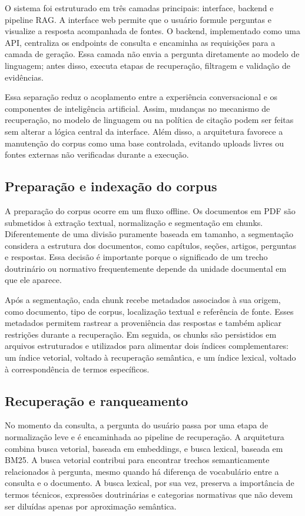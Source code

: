 O sistema foi estruturado em três camadas principais: interface, backend e pipeline RAG. A interface web permite que o usuário formule perguntas e visualize a resposta acompanhada de fontes. O backend, implementado como uma API, centraliza os endpoints de consulta e encaminha as requisições para a camada de geração. Essa camada não envia a pergunta diretamente ao modelo de linguagem; antes disso, executa etapas de recuperação, filtragem e validação de evidências.

Essa separação reduz o acoplamento entre a experiência conversacional e os componentes de inteligência artificial. Assim, mudanças no mecanismo de recuperação, no modelo de linguagem ou na política de citação podem ser feitas sem alterar a lógica central da interface. Além disso, a arquitetura favorece a manutenção do corpus como uma base controlada, evitando uploads livres ou fontes externas não verificadas durante a execução.

\subsection{Preparação e indexação do corpus}

A preparação do corpus ocorre em um fluxo offline. Os documentos em PDF são submetidos à extração textual, normalização e segmentação em chunks. Diferentemente de uma divisão puramente baseada em tamanho, a segmentação considera a estrutura dos documentos, como capítulos, seções, artigos, perguntas e respostas. Essa decisão é importante porque o significado de um trecho doutrinário ou normativo frequentemente depende da unidade documental em que ele aparece.

Após a segmentação, cada chunk recebe metadados associados à sua origem, como documento, tipo de corpus, localização textual e referência de fonte. Esses metadados permitem rastrear a proveniência das respostas e também aplicar restrições durante a recuperação. Em seguida, os chunks são persistidos em arquivos estruturados e utilizados para alimentar dois índices complementares: um índice vetorial, voltado à recuperação semântica, e um índice lexical, voltado à correspondência de termos específicos.

\subsection{Recuperação e ranqueamento}

No momento da consulta, a pergunta do usuário passa por uma etapa de normalização leve e é encaminhada ao pipeline de recuperação. A arquitetura combina busca vetorial, baseada em embeddings, e busca lexical, baseada em BM25. A busca vetorial contribui para encontrar trechos semanticamente relacionados à pergunta, mesmo quando há diferença de vocabulário entre a consulta e o documento. A busca lexical, por sua vez, preserva a importância de termos técnicos, expressões doutrinárias e categorias normativas que não devem ser diluídas apenas por aproximação semântica.


